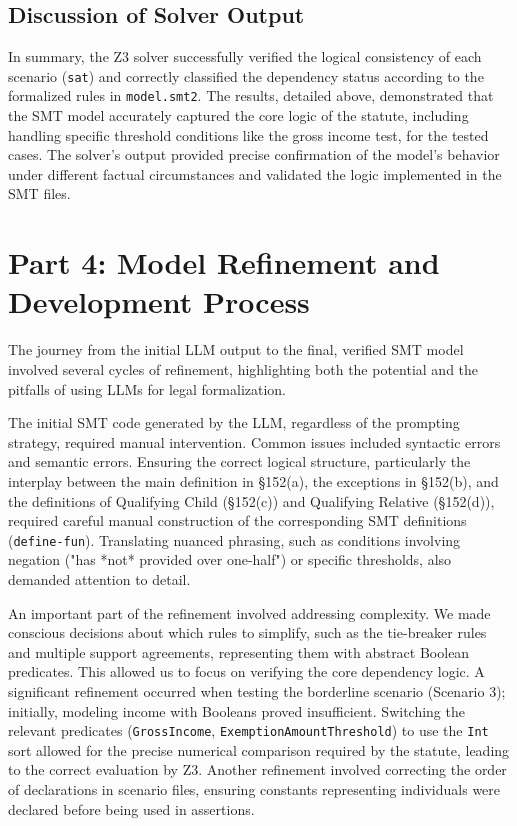\documentclass[11pt, letterpaper]{article}
\begin{document}
\subsection{Discussion of Solver Output}
In summary, the Z3 solver successfully verified the logical consistency of each scenario (\texttt{sat}) and correctly classified the dependency status according to the formalized rules in \texttt{model.smt2}. The results, detailed above, demonstrated that the SMT model accurately captured the core logic of the statute, including handling specific threshold conditions like the gross income test, for the tested cases. The solver's output provided precise confirmation of the model's behavior under different factual circumstances and validated the logic implemented in the SMT files.

\section{Part 4: Model Refinement and Development Process}

The journey from the initial LLM output to the final, verified SMT model involved several cycles of refinement, highlighting both the potential and the pitfalls of using LLMs for legal formalization.

The initial SMT code generated by the LLM, regardless of the prompting strategy, required manual intervention. Common issues included syntactic errors and semantic errors. Ensuring the correct logical structure, particularly the interplay between the main definition in §152(a), the exceptions in §152(b), and the definitions of Qualifying Child (§152(c)) and Qualifying Relative (§152(d)), required careful manual construction of the corresponding SMT definitions (\texttt{define-fun}). Translating nuanced phrasing, such as conditions involving negation ("has *not* provided over one-half") or specific thresholds, also demanded attention to detail.

An important part of the refinement involved addressing complexity. We made conscious decisions about which rules to simplify, such as the tie-breaker rules and multiple support agreements, representing them with abstract Boolean predicates. This allowed us to focus on verifying the core dependency logic. A significant refinement occurred when testing the borderline scenario (Scenario 3); initially, modeling income with Booleans proved insufficient. Switching the relevant predicates (\texttt{GrossIncome}, \texttt{ExemptionAmountThreshold}) to use the \texttt{Int} sort allowed for the precise numerical comparison required by the statute, leading to the correct evaluation by Z3. Another refinement involved correcting the order of declarations in scenario files, ensuring constants representing individuals were declared before being used in assertions.
\end{document}
